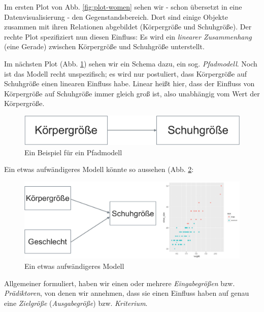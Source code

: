 \documentclass[12pt,ngerman,]{book}
\begin{document}
Im ersten Plot von Abb. \ref{fig:plot-women} sehen wir - schon übersetzt
in eine Datenvisualisierung - den Gegenstandsbereich. Dort sind einige
Objekte zusammen mit ihren Relationen abgebildet (Körpergröße und
Schuhgröße). Der rechte Plot spezifiziert nun diesen Einfluss: Es wird
ein \emph{linearer Zusammenhang} (eine Gerade) zwischen Körpergröße und
Schuhgröße unterstellt.

Im nächsten Plot (Abb. \ref{fig:mod-beispiel}) sehen wir ein Schema
dazu, ein sog. \emph{Pfadmodell}. Noch ist das Modell recht
unspezifisch; es wird nur postuliert, dass Körpergröße auf Schuhgröße
einen linearen Einfluss habe. Linear heißt hier, dass der Einfluss von
Körpergröße auf Schuhgröße immer gleich groß ist, also unabhängig vom
Wert der Körpergröße.

\begin{figure}

{\centering \includegraphics[width=0.7\linewidth]{images/Modellieren_Bsp1} 

}

\caption{Ein Beispiel für ein Pfadmodell}\label{fig:mod-beispiel}
\end{figure}

Ein etwas aufwändigeres Modell könnte so aussehen (Abb.
\ref{fig:plot-modell-bsp2}:

\begin{figure}

{\centering \includegraphics[width=0.7\linewidth]{images/Modellieren_Bsp2} 

}

\caption{Ein etwas aufwändigeres Modell}\label{fig:plot-modell-bsp2}
\end{figure}

Allgemeiner formuliert, haben wir einen oder mehrere
\emph{Eingabegrößen} bzw.
\emph{Prädiktoren}, von denen wir annehmen, dass sie
einen Einfluss haben auf genau eine \emph{Zielgröße}
(\emph{Ausgabegröße}) bzw. \emph{Kriterium}.
\end{document}
